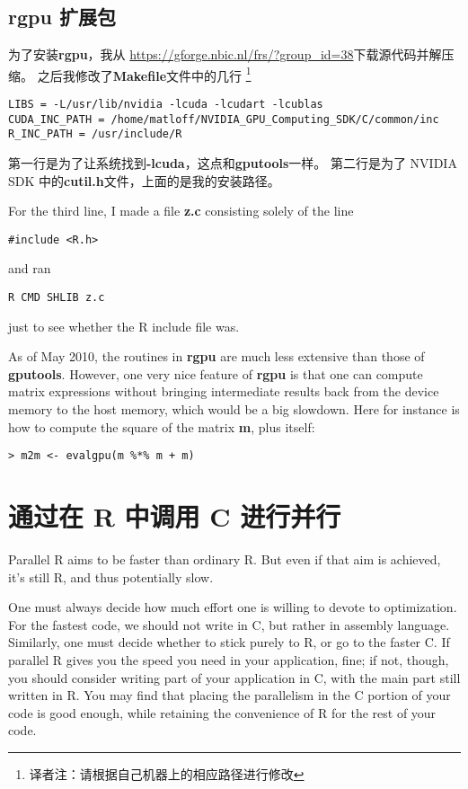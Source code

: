 \subsection{rgpu 扩展包}
\label{rgpu}

为了安装{\bf rgpu}，我从
\url{https://gforge.nbic.nl/frs/?group_id=38}下载源代码并解压缩。
之后我修改了{\bf Makefile}文件中的几行
\footnote{译者注：请根据自己机器上的相应路径进行修改}
\begin{lstlisting}
LIBS = -L/usr/lib/nvidia -lcuda -lcudart -lcublas
CUDA_INC_PATH = /home/matloff/NVIDIA_GPU_Computing_SDK/C/common/inc
R_INC_PATH = /usr/include/R
\end{lstlisting}

第一行是为了让系统找到{\bf -lcuda}，这点和{\bf gputools}一样。
第二行是为了 NVIDIA SDK 中的{\bf cutil.h}文件，上面的是我的安装路径。

For the third line, I made a file {\bf z.c} consisting solely of the
line

\begin{lstlisting}
#include <R.h>
\end{lstlisting}

and ran

\begin{lstlisting}
R CMD SHLIB z.c
\end{lstlisting}

just to see whether the R include file was.

As of May 2010, the routines in {\bf rgpu} are much less extensive than
those of {\bf gputools}.  However, one very nice feature of {\bf rgpu}
is that one can compute matrix expressions without bringing intermediate
results back from the device memory to the host memory, which would be a
big slowdown.  Here for instance is how to compute the square of the
matrix {\bf m}, plus itself:

\begin{lstlisting}
> m2m <- evalgpu(m %*% m + m)
\end{lstlisting}

\section{通过在 R 中调用 C 进行并行}
\label{cfromr}

Parallel R aims to be faster than ordinary R.  But even if that aim is
achieved, it's still R, and thus potentially slow.

One must always decide how much effort one is willing to devote to
optimization.  For the fastest code, we should not write in C, but
rather in assembly language.  Similarly, one must decide whether to
stick purely to R, or go to the faster C.  If parallel R gives you the
speed you need in your application, fine; if not, though, you should
consider writing part of your application in C, with the main part still
written in R.  You may find that placing the parallelism in the C
portion of your code is good enough, while retaining the convenience of
R for the rest of your code.

